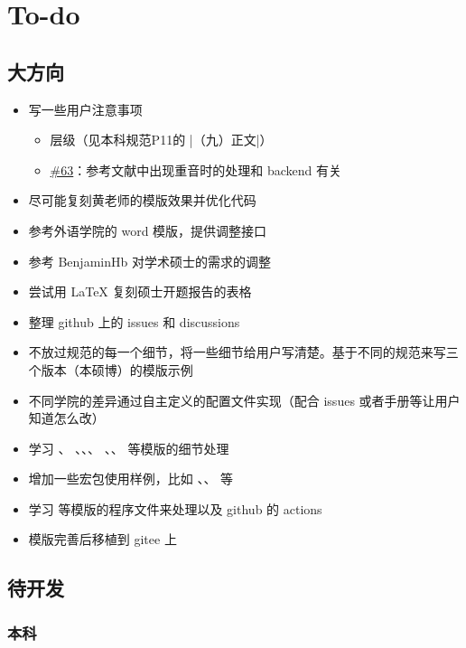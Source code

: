 
\section{To-do}

\subsection{大方向}

\begin{itemize}
  \item 写一些用户注意事项
    \begin{itemize}
      \item 层级（见本科规范P11的 |（九）正文|）
      \item \href{https://github.com/whutug/whu-thesis/issues/63}{\#63}：参考文献中出现重音时的处理和 backend 有关
    \end{itemize}
  \item 尽可能复刻黄老师的模版效果并优化代码
  \item 参考外语学院的 word 模版，提供调整接口
  \item 参考 BenjaminHb 对学术硕士的需求的调整
  \item 尝试用 \LaTeX{} 复刻硕士开题报告的表格
  \item 整理 github 上的 issues 和 discussions
  \item 不放过规范的每一个细节，将一些细节给用户写清楚。基于不同的规范来写三个版本（本硕博）的模版示例
  \item 不同学院的差异通过自主定义的配置文件实现（配合 issues 或者手册等让用户知道怎么改）
  \item 学习 、 、、、 、、 等模版的细节处理
  \item 增加一些宏包使用样例，比如 、、 等
  \item 学习  等模版的程序文件来处理以及 github 的 actions
  \item 模版完善后移植到 gitee 上
\end{itemize}



\subsection{待开发}

\subsubsection{本科}


